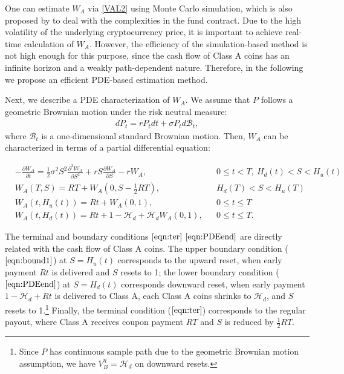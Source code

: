 \documentclass[final,pdftex]{ectaart}
\theoremstyle{plain}
\begin{document}
One can estimate $W_A$ via \eqref{VAL2} using Monte Carlo simulation, which is also proposed by \cite{adams_risk_2006} to deal with the complexities in the fund contract. Due to the high volatility of the underlying cryptocurrency price, it is important to achieve real-time calculation of $W_A$. However, the efficiency of the simulation-based method is not high enough for this purpose, since the cash flow of Class A coins has an infinite horizon and a weakly path-dependent nature. Therefore, in the following we propose an efficient PDE-based estimation method.

Next, we describe a PDE characterization of $W_A$. We assume that $P$ follows a geometric Brownian motion under the risk neutral measure:
\begin{align*}
dP_{t}=r P_tdt+\sigma P_{t}d\mathcal{B}_{t},
\end{align*}
where $\mathcal{B}_{t}$ is a one-dimensional standard Brownian motion. Then, $W_{A}$ can be characterized in terms of a partial differential equation:

\begin{align}\label{eqn:PDEstart}
&-\frac{\partial W_{A}}{\partial t} =\frac{1}{2}\sigma^{2}S^{2}\frac{\partial^{2}W_{A}}{\partial S^{2}}+r S\frac{\partial W_{A}}{\partial S}-r W_{A}, &&0\le t<T,~H_d(t)<S<H_u(t)\\\label{eqn:ter}
&W_{A}(T,S)  =RT+W_{A}(0,S-\frac{1}{2}RT),&&H_d(T)<S<H_u(T)\\\label{eqn:bound1}
&W_{A}(t,H_{u}(t))  =Rt+W_{A}(0,1),&&0\le t\le T\\\label{eqn:PDEend}
&W_{A}(t,H_d(t))  =Rt+1-\mathcal{H}_{d}+\mathcal{H}_{d}W_{A}(0,1),&&0\le t\le T.
\end{align}

The terminal and boundary conditions $\eqref{eqn:ter}$ \textendash{} $\eqref{eqn:PDEend}$ are directly related with the cash flow of Class A coins. The upper boundary condition ($\ref{eqn:bound1}$) at $S=H_{u}(t)$ corresponds to the upward reset, when early payment $Rt$ is delivered and $S$ resets to 1; the lower boundary condition ($\ref{eqn:PDEend}$) at $S=H_d(t)$ corresponds downward reset, when early payment $1-\mathcal{H}_d+Rt$ is delivered to Class A, each Class A coins shrinks to $\mathcal{H}_{d}$, and $S$ resets to 1.\footnote{Since $P$ has continuous sample path due to the geometric Brownian motion assumption, we have $V_B^{\eta}=\mathcal{H}_d$ on downward resets.} Finally, the terminal condition ($\ref{eqn:ter}$) corresponds to the regular payout, where Class A receives coupon payment $RT$ and $S$ is reduced by $\frac{1}{2}RT$.
\end{document}
